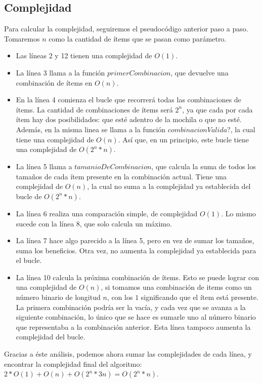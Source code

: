 \documentclass[10pt, a4paper]{article}
\begin{document}
\subsection{Complejidad}
Para calcular la complejidad, seguiremos el pseudocódigo anterior paso a paso. Tomaremos $n$ como la cantidad de ítems que se pasan como parámetro.\par
\begin{itemize}
	\item Las líneas 2 y 12 tienen una complejidad de $O(1)$.
	\item La línea 3 llama a la función $primerCombinacion$, que devuelve una combinación de ítems en $O(n)$.
	\item En la línea 4 comienza el bucle que recorrerá todas las combinaciones de ítems. La cantidad de combinaciones de ítems será $2^n$, ya que cada por cada ítem hay dos posibilidades: que esté adentro de la mochila o que no esté. Además, en la misma linea se llama a la función $combinacionValida?$, la cual tiene una complejidad de $O(n)$. Así que, en un principio, este bucle tiene una complejidad de $O(2^n * n)$.
	\item La línea 5 llama a $tamanioDeCombinacion$, que calcula la suma de todos los tamaños de cada ítem presente en la combinación actual. Tiene una complejidad de $O(n)$, la cual no suma a la complejidad ya establecida del bucle de $O(2^n * n)$.
	\item La línea 6 realiza una comparación simple, de complejidad $O(1)$. Lo mismo sucede con la línea 8, que solo calcula un máximo.
	\item La línea 7 hace algo parecido a la línea 5, pero en vez de sumar los tamaños, suma los beneficios. Otra vez, no aumenta la complejidad ya establecida para el bucle.
	\item La línea 10 calcula la próxima combinación de ítems. Esto se puede lograr con una complejidad de $O(n)$, si tomamos una combinación de items como un número binario de longitud $n$, con los $1$ significando que el ítem está presente. La primera combinación podría ser la vacía, y cada vez que se avanza a la siguiente combinación, lo único que se hace es sumarle uno al número binario que representaba a la combinación anterior. Esta línea tampoco aumenta la complejidad del bucle.
\end{itemize}
Gracias a éste análisis, podemos ahora sumar las complejidades de cada línea, y encontrar la complejidad final del algoritmo: $2 * O(1) + O(n) + O(2^n * 3n) = O(2^n * n)$.
\end{document}
